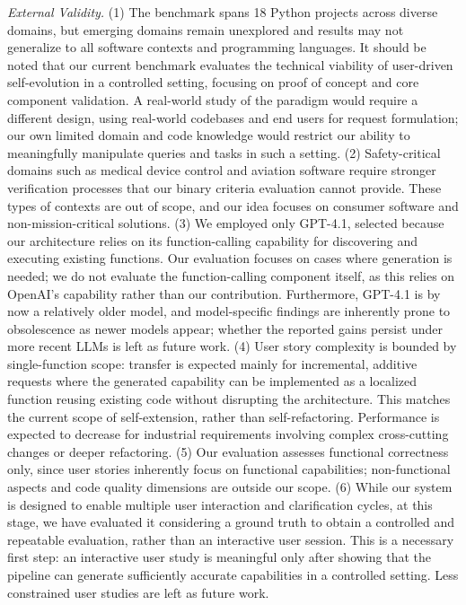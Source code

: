 \documentclass[sigconf,screen]{acmart}
\begin{document}
\textit{External Validity.} (1) The benchmark spans 18 Python projects across diverse domains, but emerging domains remain unexplored and results may not generalize to all software contexts and programming languages. It should be noted that our current benchmark evaluates the technical viability of user-driven self-evolution in a controlled setting, focusing on proof of concept and core component validation. A real-world study of the paradigm would require a different design, using real-world codebases and end users for request formulation; our own limited domain and code knowledge would restrict our ability to meaningfully manipulate queries and tasks in such a setting. (2) Safety-critical domains such as medical device control and aviation software require stronger verification processes that our binary criteria evaluation cannot provide. These types of contexts are out of scope, and our idea focuses on consumer software and non-mission-critical solutions. (3) We employed only GPT-4.1, selected because our architecture relies on its function-calling capability for discovering and executing existing functions. Our evaluation focuses on cases where generation is needed; we do not evaluate the function-calling component itself, as this relies on OpenAI's capability rather than our contribution. Furthermore, GPT-4.1 is by now a relatively older model, and model-specific findings are inherently prone to obsolescence as newer models appear; whether the reported gains persist under more recent LLMs is left as future work. (4)  User story complexity is bounded by single-function scope: transfer is expected mainly for incremental, additive requests where the generated capability can be implemented as a localized function reusing existing code without disrupting the architecture. This matches the current scope of self-extension, rather than self-refactoring. Performance is expected to decrease for industrial requirements involving complex cross-cutting changes or deeper refactoring. (5) Our evaluation assesses functional correctness only, since user stories inherently focus on functional capabilities; non-functional aspects and code quality dimensions are outside our scope. (6) While our system is designed to enable multiple user interaction and clarification cycles, at this stage, we have evaluated it considering a ground truth to obtain a controlled and repeatable evaluation, rather than an interactive user session. This is a necessary first step: an interactive user study is meaningful only after showing that the pipeline can generate sufficiently accurate capabilities in a controlled setting. Less constrained user studies are left as future work.
\end{document}
